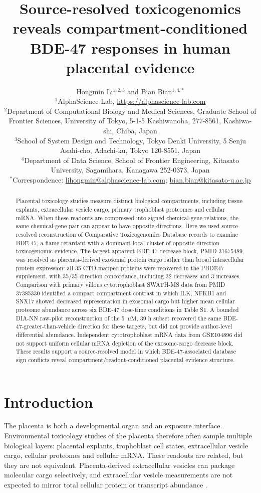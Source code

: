 \documentclass[11pt]{article}
\title{Source-resolved toxicogenomics reveals compartment-conditioned BDE-47 responses in human placental evidence}
\author{\parbox{0.94\textwidth}{\centering
Hongmin Li$^{1,2,3}$ and Bian Bian$^{1,4,*}$\\[0.25em]
\scriptsize $^{1}$AlphaScience Lab, \url{https://alphascience-lab.com}\\
\scriptsize $^{2}$Department of Computational Biology and Medical Sciences, Graduate School of Frontier Sciences, University of Tokyo, 5-1-5 Kashiwanoha, 277-8561, Kashiwa-shi, Chiba, Japan\\
\scriptsize $^{3}$School of System Design and Technology, Tokyo Denki University, 5 Senju Asahi-cho, Adachi-ku, Tokyo 120-8551, Japan\\
\scriptsize $^{4}$Department of Data Science, School of Frontier Engineering, Kitasato University, Sagamihara, Kanagawa 252-0373, Japan\\[0.25em]
\scriptsize $^{*}$Correspondence: \href{mailto:lihongmin@alphascience-lab.com}{lihongmin@alphascience-lab.com}; \href{mailto:bian.bian@kitasato-u.ac.jp}{bian.bian@kitasato-u.ac.jp}}}
\date{}
\newcommand{\ctd}{Comparative Toxicogenomics Database}
\newcommand{\microM}{\ensuremath{\mu\mathrm{M}}}
\begin{document}
\maketitle

\begin{abstract}
Placental toxicology studies measure distinct biological compartments, including tissue explants, extracellular vesicle cargo, primary trophoblast proteomes and cellular mRNA. When these readouts are compressed into signed chemical-gene relations, the same chemical-gene pair can appear to have opposite directions. Here we used source-resolved reconstruction of \ctd{} records to examine BDE-47, a flame retardant with a dominant local cluster of opposite-direction toxicogenomic evidence. The largest apparent BDE-47 decrease block, PMID 31675489, was resolved as placenta-derived exosomal protein cargo rather than broad intracellular protein expression: all 35 CTD-mapped proteins were recovered in the PBDE47 supplement, with 35/35 direction concordance, including 32 decreases and 3 increases. Comparison with primary villous cytotrophoblast SWATH-MS data from PMID 37385330 identified a compact compartment contrast in which ILK, NFKB1 and SNX17 showed decreased representation in exosomal cargo but higher mean cellular proteome abundance across six BDE-47 dose-time conditions in Table S1. A bounded DIA-NN raw-pilot reconstruction of the 5~\microM{}, 39 h subset recovered the same BDE-47-greater-than-vehicle direction for these targets, but did not provide author-level differential abundance. Independent cytotrophoblast mRNA data from GSE104896 did not support uniform cellular mRNA depletion of the exosome-cargo decrease block. These results support a source-resolved model in which BDE-47-associated database sign conflicts reveal compartment/readout-conditioned placental evidence structure.
\end{abstract}

\section{Introduction}

The placenta is both a developmental organ and an exposure interface. Environmental toxicology studies of the placenta therefore often sample multiple biological layers: placental explants, trophoblast cell states, extracellular vesicle cargo, cellular proteomes and cellular mRNA. These readouts are related, but they are not equivalent. Placenta-derived extracellular vesicles can package molecular cargo selectively, and extracellular vesicle measurements are not expected to mirror total cellular protein or transcript abundance \cite{raposo2013,vanNiel2018,thery2018,burkova2021,nishi2024}.
\end{document}
